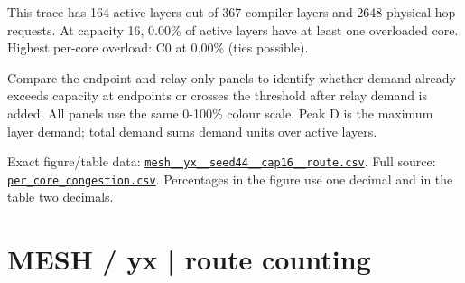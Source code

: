 \documentclass[10pt,a4paper]{article}
\begin{document}
This trace has 164 active layers out of 367 compiler layers and 2648 physical hop requests. At capacity 16, 0.00\% of active layers have at least one overloaded core. Highest per-core overload: C0 at 0.00\% (ties possible).\par
Compare the endpoint and relay-only panels to identify whether demand already exceeds capacity at endpoints or crosses the threshold after relay demand is added. All panels use the same 0-100\% colour scale. Peak D is the maximum layer demand; total demand sums demand units over active layers.\par
Exact figure/table data: \href{\detokenize{file:///home/dhruv-pansuriya/Documents/BTP/Compiler-Driven-ACE/output/pdf/qaoa_methods_congestion/tables/mesh__yx__seed44__cap16__route.csv}}{\nolinkurl{mesh__yx__seed44__cap16__route.csv}}. Full source: \href{\detokenize{file:///home/dhruv-pansuriya/Documents/BTP/Compiler-Driven-ACE/results/qaoa_2seed_2026-10-26/congestion/per_core_congestion.csv}}{\nolinkurl{per_core_congestion.csv}}. Percentages in the figure use one decimal and in the table two decimals.\par
\clearpage
\section*{MESH / yx | route counting}
\end{document}
